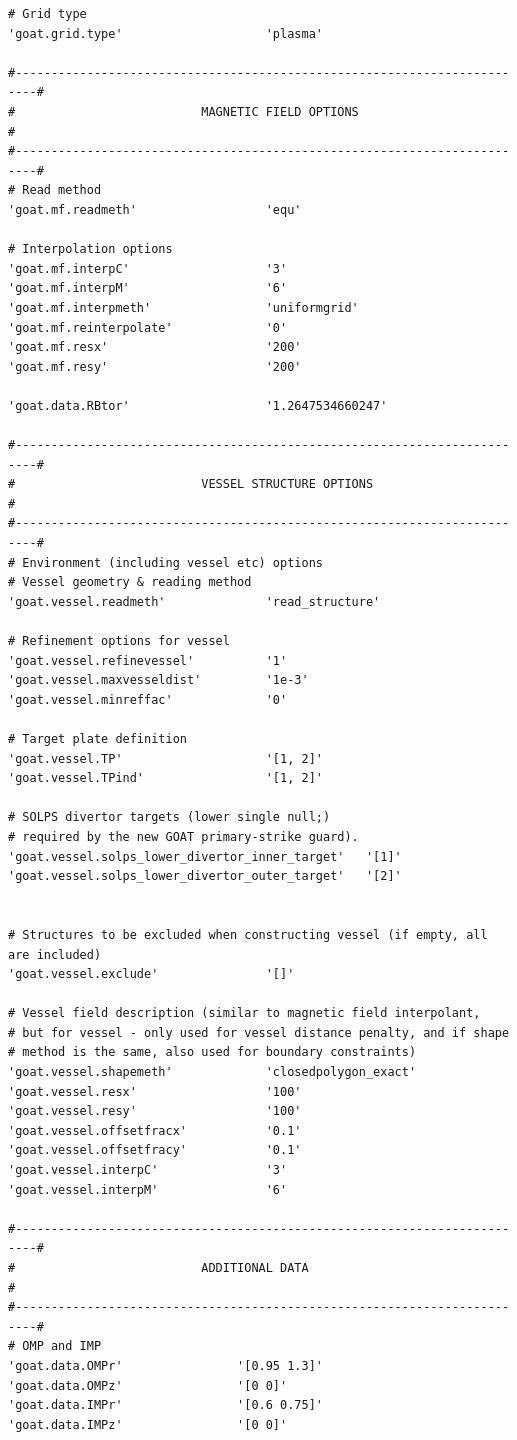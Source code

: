 \documentclass[11pt,a4paper]{article}
\begin{document}
\begin{lstlisting}
# Grid type
'goat.grid.type'                    'plasma'

#-------------------------------------------------------------------------#
#                          MAGNETIC FIELD OPTIONS                         #
#-------------------------------------------------------------------------#
# Read method
'goat.mf.readmeth'                  'equ'

# Interpolation options
'goat.mf.interpC'                   '3'
'goat.mf.interpM'                   '6'
'goat.mf.interpmeth'                'uniformgrid'
'goat.mf.reinterpolate'             '0'
'goat.mf.resx'                      '200'
'goat.mf.resy'                      '200'

'goat.data.RBtor'                   '1.2647534660247'

#-------------------------------------------------------------------------#
#                          VESSEL STRUCTURE OPTIONS                       #
#-------------------------------------------------------------------------#
# Environment (including vessel etc) options 
# Vessel geometry & reading method
'goat.vessel.readmeth'              'read_structure'

# Refinement options for vessel
'goat.vessel.refinevessel'          '1'
'goat.vessel.maxvesseldist'         '1e-3'
'goat.vessel.minreffac'             '0'

# Target plate definition
'goat.vessel.TP'                    '[1, 2]'
'goat.vessel.TPind'                 '[1, 2]'

# SOLPS divertor targets (lower single null;)
# required by the new GOAT primary-strike guard).
'goat.vessel.solps_lower_divertor_inner_target'   '[1]'
'goat.vessel.solps_lower_divertor_outer_target'   '[2]'


# Structures to be excluded when constructing vessel (if empty, all are included)
'goat.vessel.exclude'               '[]'

# Vessel field description (similar to magnetic field interpolant, 
# but for vessel - only used for vessel distance penalty, and if shape
# method is the same, also used for boundary constraints)
'goat.vessel.shapemeth'             'closedpolygon_exact'
'goat.vessel.resx'                  '100'
'goat.vessel.resy'                  '100'
'goat.vessel.offsetfracx'           '0.1'
'goat.vessel.offsetfracy'           '0.1'
'goat.vessel.interpC'               '3'
'goat.vessel.interpM'               '6'

#-------------------------------------------------------------------------#
#                          ADDITIONAL DATA                                #
#-------------------------------------------------------------------------#
# OMP and IMP
'goat.data.OMPr'                '[0.95 1.3]'
'goat.data.OMPz'                '[0 0]'
'goat.data.IMPr'                '[0.6 0.75]'
'goat.data.IMPz'                '[0 0]'


\end{lstlisting}
\end{document}

